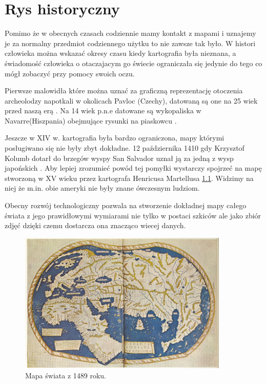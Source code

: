 
\chapter{Rys historyczny}
\label{sec:hisotryMap}

Pomimo że w obecnych czasach codziennie mamy kontakt z mapami i uznajemy je za normalny przedmiot codziennego użytku to nie zawsze tak było. W histori człowieka można wskazać okresy czasu kiedy kartografia była nieznana, a świadomość człowieka o otaczajacym go świecie ograniczała się jedynie do tego co mógł zobaczyć przy pomocy swoich oczu.

Pierwsze malowidła które można uznać za graficzną reprezentację otoczenia archeolodzy napotkali w okolicach Pavloc (Czechy), datowaną są one na 25 wiek przed naszą erą \cite{pre2} . Na 14 wiek p.n.e datowane są wykopaliska w Navarre(Hiszpania) obejmujące rysunki na piaskowcu \cite{pre1}.

Jeszcze w XIV w. kartografia była bardzo ograniczona, mapy którymi posługiwano się nie były zbyt dokładne. 12 października 1410 gdy Krzysztof Kolumb dotarł do brzegów wyspy San Salvador uznał ją za jedną z wysp japońskich \cite{columb}. Aby lepiej zrozumieć powód tej pomyłki wystarczy spojrzeć na mapę stworzoną w XV wieku przez kartografa Henricusa Martellusa \ref{fig:worldMap1}. Widzimy na niej że m.in. obie ameryki nie były znane ówczesnym ludziom.

Obecny rozwój technologiczny pozwala na stworzenie dokładnej mapy całego świata z jego prawidłowymi wymiarami nie tylko w postaci szkiców ale jako zbiór zdjęć dzięki czemu dostarcza ona znacząco wiecej danych.

\begin{figure}[H]
  \centering
    \includegraphics[width=100mm]{ge/worldMap1.jpg}
  \caption{Mapa świata z 1489 roku.}
  \label{fig:worldMap1}
\end{figure}
